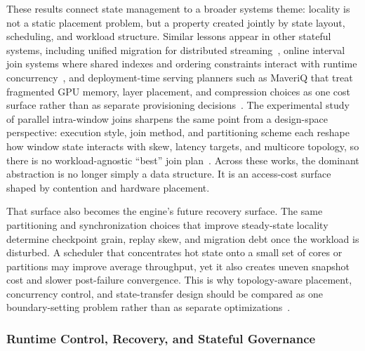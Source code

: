 \documentclass[acmsmall,screen,review]{acmart}
\begin{document}
These results connect state management to a broader systems theme: locality is not a static placement problem, but a property created jointly by state layout, scheduling, and workload structure. Similar lessons appear in other stateful systems, including unified migration for distributed streaming~\cite{mao2025spacker}, online interval join systems where shared indexes and ordering constraints interact with runtime concurrency~\cite{zhang2023openmldb}, and deployment-time serving planners such as MaveriQ that treat fragmented GPU memory, layer placement, and compression choices as one cost surface rather than as separate provisioning decisions~\cite{liakopoulos2025maveriq}. The experimental study of parallel intra-window joins sharpens the same point from a design-space perspective: execution style, join method, and partitioning scheme each reshape how window state interacts with skew, latency targets, and multicore topology, so there is no workload-agnostic ``best'' join plan~\cite{zhang2021intrawindowjoin}. Across these works, the dominant abstraction is no longer simply a data structure. It is an access-cost surface shaped by contention and hardware placement.

That surface also becomes the engine's future recovery surface. The same partitioning and synchronization choices that improve steady-state locality determine checkpoint grain, replay skew, and migration debt once the workload is disturbed. A scheduler that concentrates hot state onto a small set of cores or partitions may improve average throughput, yet it also creates uneven snapshot cost and slower post-failure convergence. This is why topology-aware placement, concurrency control, and state-transfer design should be compared as one boundary-setting problem rather than as separate optimizations~\cite{zhang2019briskstream,zhang2020concurrent,carbone2015asynchronous,zhao2024recovery,mao2025spacker}.

\subsubsection{Runtime Control, Recovery, and Stateful Governance}
\end{document}
